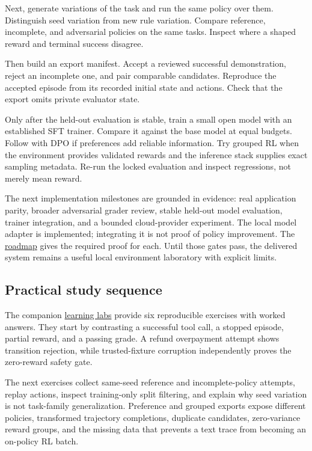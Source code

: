 \documentclass[
  11pt,
  letterpaper,
]{article}
\begin{document}
Next, generate variations of the task and run the same policy over them.
Distinguish seed variation from new rule variation. Compare reference,
incomplete, and adversarial policies on the same tasks. Inspect where a
shaped reward and terminal success disagree.

Then build an export manifest. Accept a reviewed successful
demonstration, reject an incomplete one, and pair comparable candidates.
Reproduce the accepted episode from its recorded initial state and
actions. Check that the export omits private evaluator state.

Only after the held-out evaluation is stable, train a small open model
with an established SFT trainer. Compare it against the base model at
equal budgets. Follow with DPO if preferences add reliable information.
Try grouped RL when the environment provides validated rewards and the
inference stack supplies exact sampling metadata. Re-run the locked
evaluation and inspect regressions, not merely mean reward.

The next implementation milestones are grounded in evidence: real
application parity, broader adversarial grader review, stable held-out
model evaluation, trainer integration, and a bounded cloud-provider
experiment. The local model adapter is implemented; integrating it is
not proof of policy improvement. The \href{../ROADMAP.md}{roadmap} gives
the required proof for each. Until those gates pass, the delivered
system remains a useful local environment laboratory with explicit
limits.

\subsection{Practical study sequence}\label{practical-study-sequence}

The companion \href{learning-labs.md}{learning labs} provide six
reproducible exercises with worked answers. They start by contrasting a
successful tool call, a stopped episode, partial reward, and a passing
grade. A refund overpayment attempt shows transition rejection, while
trusted-fixture corruption independently proves the zero-reward safety
gate.

The next exercises collect same-seed reference and incomplete-policy
attempts, replay actions, inspect training-only split filtering, and
explain why seed variation is not task-family generalization. Preference
and grouped exports expose different policies, transformed trajectory
completions, duplicate candidates, zero-variance reward groups, and the
missing data that prevents a text trace from becoming an on-policy RL
batch.
\end{document}

